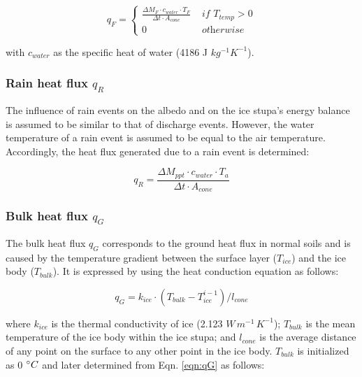 \begin{equation}
	q_{F} = \left\{ \begin{array}{ll}
		\frac{ \Delta M_F \cdot c_{water} \cdot T_F}{\Delta t \cdot A_{cone}} & \textit{ if } T_{temp} > 0 \\
		0                                                                     & \textit{ otherwise}
	\end{array} \right.
\end{equation}

with $c_{water}$ as the specific heat of water (4186 J $kg^{-1} K^{-1}$).

\subsubsection{Rain heat flux \texorpdfstring{$q_{R}$}{Lg} }

The influence of rain events on the albedo and on the ice stupa's energy balance is assumed to be similar to that of discharge
events. However, the water temperature of a rain event is assumed to be equal to the air temperature. Accordingly,
the heat flux generated due to a rain event is determined:

\begin{equation}
	q_{R} = \frac{ \Delta M_{ppt} \cdot c_{water} \cdot T_a}{\Delta t \cdot A_{cone}}
	\label{eqn:qR}
\end{equation}

\subsubsection{Bulk heat flux \texorpdfstring{$q_{G}$}{Lg}} \label{sec:Bulkflux}

The bulk heat flux $q_{G}$ corresponds to the ground heat flux in normal soils and is caused by the
temperature gradient between the surface layer ($T_{ice}$) and the ice body ($T_{bulk}$). It is expressed by
using the heat conduction equation as follows:

\begin{equation} q_{G} = k_{ice} \cdot (T_{bulk}-T_{ice}^{i-1})/l_{cone} \label{eqn:qG}    \end{equation}

where $k_{ice}$ is the thermal conductivity of ice (2.123 $W\, m^{-1}\,K^{-1}$); $T_{bulk}$ is the mean
temperature of the ice body within the ice stupa; and $l_{cone}$ is the average distance of any point on the
surface to any other point in the ice body. $T_{bulk}$ is initialized as 0 $^{\circ} C$ and later determined from
Eqn. \ref{eqn:qG} as follows:

